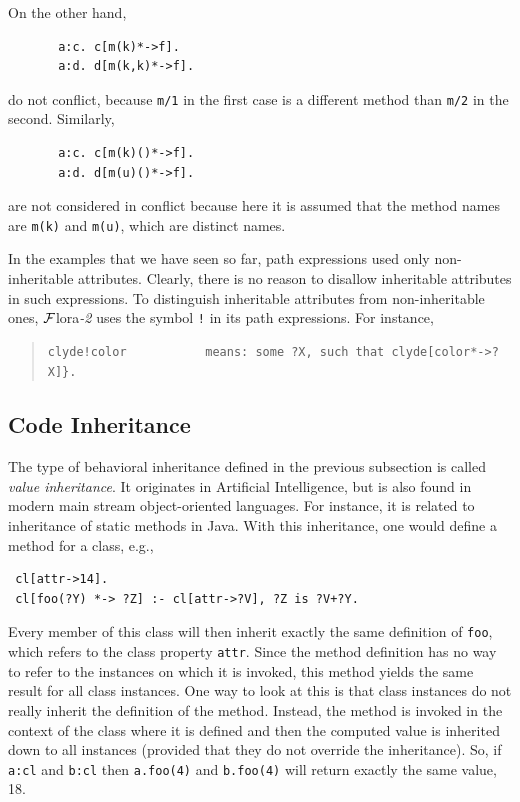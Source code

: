 \documentclass[11pt]{article}
\newcommand{\FLORA}{{\mbox{\sc ${\cal F}${lora}\rm\emph{-2}}}\xspace}
\begin{document}
\begin{enumerate}
  On the other hand,
  \begin{verbatim}
       a:c. c[m(k)*->f].    
       a:d. d[m(k,k)*->f].     
  \end{verbatim}
  do not conflict, because {\tt m/1} in the first case is a different
  method than {\tt m/2} in the second. Similarly,
  \begin{verbatim}
       a:c. c[m(k)()*->f].    
       a:d. d[m(u)()*->f].     
  \end{verbatim}
  are not considered in conflict because here it is assumed that the method
  names are {\tt m(k)} and {\tt m(u)}, which are distinct names.
\end{enumerate}

In the examples that we have seen so far, path expressions used only
non-inheritable attributes. Clearly, there is no reason to disallow
inheritable attributes in such expressions. To distinguish inheritable
attributes from non-inheritable ones, \FLORA uses the symbol
{\tt !} in its path expressions. For instance,
\begin{quote}
\begin{verbatim}
clyde!color           means: some ?X, such that clyde[color*->?X]}.
\end{verbatim}
\end{quote}

\subsection{Code Inheritance}

The type of behavioral inheritance defined in the previous subsection is
called \emph{value inheritance}.  It originates in Artificial Intelligence,
but is also found in modern main stream object-oriented languages.
For instance, it is related to inheritance of static methods in Java.
With this inheritance, one would define a method for a class, e.g., 
\begin{verbatim}
 cl[attr->14].
 cl[foo(?Y) *-> ?Z] :- cl[attr->?V], ?Z is ?V+?Y.
\end{verbatim}
Every member of this class will then inherit exactly the same definition of
{\tt foo},
which refers to the class property {\tt attr}. Since the method definition
has no way to refer to the instances on which it is invoked,
this method yields the same result for all class instances.
One way to look at this is
that class instances do not really inherit the definition of the method.
Instead, the method is invoked in the context of the class where it is
defined and then the computed value is inherited down to all instances
(provided that they do not override the inheritance).  So, if {\tt a:cl}
and {\tt b:cl} then {\tt a.foo(4)} and {\tt b.foo(4)} will return exactly
the same value, 18.
\end{document}
